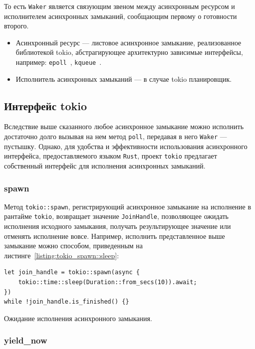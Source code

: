 То есть \verb|Waker| является связующим звеном между асинхронным ресурсом и исполнителем асинхронных замыканий, сообщающим первому о готовности второго.

\begin{itemize}
    \item Асинхронный ресурс --- листовое асинхронное замыкание, реализованное библиотекой tokio, абстрагирующее архитектурно зависимые интерфейсы, например: \verb|epoll|~\cite{epollLib}, \verb|kqueue|~\cite{kqueue}.
    \item Исполнитель асинхронных замыканий --- в случае tokio планировщик.
\end{itemize}

\subsection{Интерфейс tokio}

Вследствие выше сказанного любое асинхронное замыкание можно исполнить достаточно долго вызывая на нем метод \verb|poll|, передавая в него \verb|Waker| --- пустышку. Однако, для удобства и эффективности использования асинхронного интерфейса, предоставляемого языком \verb|Rust|, проект \verb|tokio| предлагает собственный интерфейс для исполнения асинхронных замыканий.

\subsubsection{spawn}

Метод \verb|tokio::spawn|, регистрирующий асинхронное замыкание на исполнение в рантайме \verb|tokio|, возвращает значение \verb|JoinHandle|, позволяющее ожидать исполнения исходного замыкания, получать результирующее значение или отменять исполнение вовсе. Например, исполнить представленное выше замыкание можно способом, приведенным на листинге~\ref{listing:tokio_spawn::sleep}:

\begin{listing}[H]
    \begin{verbatim}
let join_handle = tokio::spawn(async {
    tokio::time::sleep(Duration::from_secs(10)).await;
})
while !join_handle.is_finished() {}
    \end{verbatim}

    \caption{Ожидание исполнения асинхронного замыкания.}
    \label{listing:tokio_spawn::sleep}
\end{listing}

\subsubsection{yield\_now}

